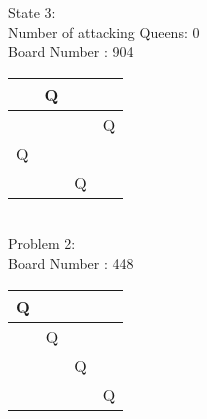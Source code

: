 \documentclass[a4paper,10pt]{article}
\begin{document}
\begin{flushleft}
\begin{flushleft}
\begin{flushleft}
\begin{flushleft}
State 3:\\
Number of attacking Queens: 0\\
Board Number :  904\\
\vspace{5mm}
    \begin{tabular}{| l | l | l | l |}
    \hline
     & Q & & \\ \hline
     & & & Q \\ \hline
     Q & & & \\ \hline
     & & Q & \\ \hline
    \end{tabular}
\break
\vspace{5mm}
\\
Problem 2:\\
\vspace{2mm}
\hline
\vspace{3mm}
Board Number : 448\\
\begin{flushleft}
    \begin{tabular}{| l | l | l | l |}
    \hline
     Q & & & \\ \hline
     & Q & &  \\ \hline
     & & Q & \\ \hline
     & & & Q\\ \hline
    \end{tabular}
\break


\end{flushleft}
\end{flushleft}
\end{flushleft}
\end{flushleft}
\end{flushleft}
\end{document}
